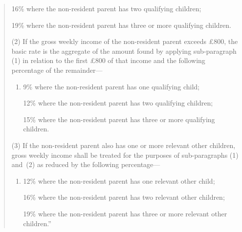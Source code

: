 \documentclass[12pt,a4paper]{article}
\begin{document}
{\begin{quotation}
\begin{enumerate}
16\% where the non-resident parent has two qualifying children;

19\% where the non-resident parent has three or more qualifying children.
\end{enumerate}

(2) If the gross weekly income of the non-resident parent exceeds £800, the basic rate is the aggregate of the amount found by applying sub-paragraph (1) in relation to the first £800 of that income and the following percentage of the remainder—
\begin{enumerate}\item[]
9\% where the non-resident parent has one qualifying child;

12\% where the non-resident parent has two qualifying children;

15\% where the non-resident parent has three or more qualifying children.
\end{enumerate}

(3) If the non-resident parent also has one or more relevant other children, gross weekly income shall be treated for the purposes of sub-paragraphs (1) and~(2) as reduced by the following percentage—
\begin{enumerate}\item[]
12\% where the non-resident parent has one relevant other child;

16\% where the non-resident parent has two relevant other children;

19\% where the non-resident parent has three or more relevant other children.”
\end{enumerate}
\end{quotation}

%
%
%


}
\end{document}
